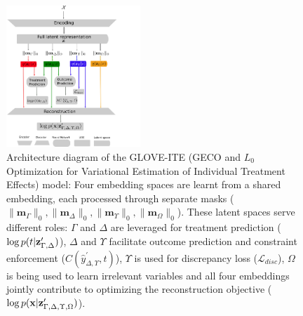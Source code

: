 \documentclass[doubleblind]{ecai}
\begin{document}
	
	\begin{figure}[ht]
		\centering
		\includegraphics[width=0.45\textwidth]{Images/arch_4.png}
		\caption{Architecture diagram of the GLOVE-ITE (GECO and $L_0$ Optimization for Variational Estimation of Individual Treatment Effects) model: Four embedding spaces are learnt from a shared embedding, each processed through separate masks ($\|\mathbf{m}_{\Gamma}\|_0,\|\mathbf{m}_{\Delta}\|_0,\|\mathbf{m}_{\Upsilon}\|_0,\|\mathbf{m}_{\Omega}\|_0$). These latent spaces serve different roles: $\Gamma$ and $\Delta$ are leveraged for treatment prediction ($\log p( t | \bold{z}_{\Gamma,\Delta}^\prime)$), $\Delta$ and $\Upsilon$ facilitate outcome prediction and constraint enforcement ($C( \hat{y}_{\Delta , \Upsilon}^\prime, t ) $), $\Upsilon$ is used for discrepancy loss ($\mathcal{L}_\mathit{disc}$), $\Omega$ is being used to learn irrelevant variables and all four embeddings jointly contribute to optimizing the reconstruction objective ($\log p( \mathbf{x} | \bold{z}_{\Gamma , \Delta , \Upsilon, \Omega}^\prime  )$).}
		
		
		
		
		\label{fig:arch}
	\end{figure}
	
\end{document}

